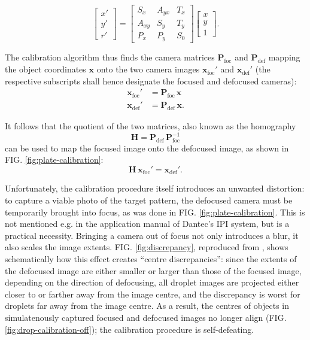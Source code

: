 \documentclass[floatfix,aip,rsi,reprint,graphicx]{revtex4-1}
\begin{document}
\begin{equation}
\left[\begin{array}{c} x'\\ y'\\ r' \end{array} \right]
=
\left[ \begin{array}{ccc}
S_x & A_{yx} &  T_x \\
A_{xy} & S_y &  T_y \\
P_x & P_y & S_0
\end{array} \right]
\left[ \begin{array}{c} x\\ y \\ 1 \end{array} \right].
\end{equation}

The calibration algorithm thus finds the camera matrices
$\mathbf{P}_\text{foc}$ and $\mathbf{P}_\text{def}$ mapping the
object coordinates $\mathbf{x}$ onto the two camera images
$\mathbf{x}_\text{foc}'$ and $\mathbf{x}_\text{def}'$ (the respective 
    subscripts shall hence designate the focused and defocused
    cameras):
\begin{align}
    \mathbf{x}_\text{foc}' &= \mathbf{P}_\text{foc} \, \mathbf{x} \\
    \mathbf{x}_\text{def}' &= \mathbf{P}_\text{def} \, \mathbf{x}.
\end{align}

It follows that the quotient of the two matrices, also known as the homography
\begin{equation}
    \mathbf{H} = \mathbf{P}_\text{def} \, \mathbf{P}_\text{foc}^{-1}
\end{equation}
can be used to map the focused image onto the defocused image, as shown in FIG.
\ref{fig:plate-calibration}:
\begin{equation}
    \mathbf{H}\, \mathbf{x}_\text{foc}' = \mathbf{x}_\text{def}'.
    \label{homography-definition}
\end{equation}

Unfortunately, the calibration procedure itself introduces an unwanted
distortion: to capture a viable photo of the target pattern, the defocused
camera must be temporarily brought into focus, as was done in
FIG. \ref{fig:plate-calibration}. This is not mentioned e.g. in the
application manual of Dantec's IPI system, but is a practical necessity.
Bringing a camera out of focus not only introduces a blur, it also scales the
image extents. FIG. \ref{fig:discrepancy}, reproduced from \citet{Hardalupas10},
shows schematically how this effect creates ``centre discrepancies'': since the
extents of the defocused image are either smaller or larger than those of the
focused image, depending on the direction of defocusing, all droplet images are
projected either closer to or farther away from the image centre, and the
discrepancy is worst for droplets far away from the image centre. As a result,
the centres of objects in simulatenously captured focused and defocused images
no longer align (FIG. \ref{fig:drop-calibration-off}); the calibration procedure is self-defeating.
\end{document}
